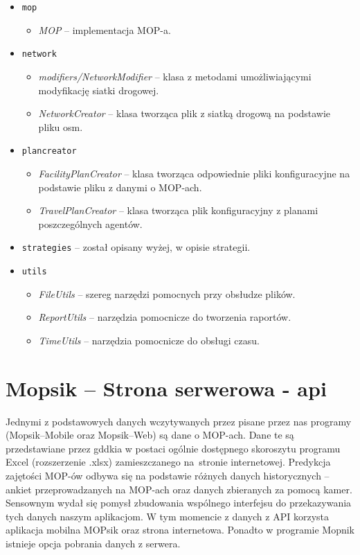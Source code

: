 \begin{itemize}
\begin{itemize}
        \end{itemize}
    \item \texttt{mop}
        \begin{itemize}
            \item \textit{MOP} -- implementacja MOP-a.
        \end{itemize}
    \item \texttt{network}
        \begin{itemize}
            \item \textit{modifiers/NetworkModifier} -- klasa z metodami umożliwiającymi modyfikację siatki drogowej.
            \item \textit{NetworkCreator} -- klasa tworząca plik z siatką drogową na podstawie pliku osm.
        \end{itemize}
    \item \texttt{plancreator}
        \begin{itemize}
            \item \textit{FacilityPlanCreator} -- klasa tworząca odpowiednie pliki konfiguracyjne na podstawie pliku z danymi o MOP-ach.
            \item \textit{TravelPlanCreator} -- klasa tworząca plik konfiguracyjny z planami poszczególnych agentów.
        \end{itemize}
    \item \texttt{strategies} -- został opisany wyżej, w opisie strategii.
    \item \texttt{utils}
        \begin{itemize}
            \item \textit{FileUtils} -- szereg narzędzi pomocnych przy obsłudze plików.
            \item \textit{ReportUtils} -- narzędzia pomocnicze do tworzenia raportów.
            \item \textit{TimeUtils} -- narzędzia pomocnicze do obsługi czasu.
        \end{itemize}        
    
\end{itemize}
\chapter{Mopsik -- Strona serwerowa - \acrshort{api}}\label{r:apka} 

Jednymi z podstawowych danych wczytywanych przez pisane przez nas programy (Mopsik--Mobile oraz Mopsik--Web) są dane o MOP-ach. Dane te są przedstawiane przez \acrshort{gddkia} w postaci ogólnie dostępnego skoroszytu programu Excel (rozszerzenie .xlsx) zamieszczanego na~stronie internetowej.
Predykcja zajętości MOP-ów odbywa się na podstawie różnych danych historycznych -- ankiet przeprowadzanych na MOP-ach oraz danych zbieranych za pomocą kamer.
Sensownym wydał się pomysł zbudowania wspólnego interfejsu do przekazywania tych danych naszym aplikacjom. W tym momencie z danych z API korzysta aplikacja mobilna MOPsik oraz strona internetowa. Ponadto w programie Mopnik istnieje opcja pobrania danych z serwera.

